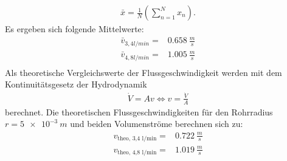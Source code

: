 \begin{align*}
  \bar{x}=\frac{1}{N} \left( \sum^{N}_{n=1} x_n \right).
\end{align*}
Es ergeben sich folgende Mittelwerte:
\begin{align*}
  \bar{v}_{3,4 l/min}= & \SI{0.658}{\frac{m}{s}} \\
  \bar{v}_{4,8 l/min}= & \SI{1.005}{\frac{m}{s}} \\
\end{align*}
Als theoretische Vergleichswerte der Flussgeschwindigkeit werden mit dem Kontinuitätsgesetz der Hydrodynamik
\begin{align}
  \dot{V}=A v \Leftrightarrow v= \frac{\dot{V}}{A}
  \label{eqn:konti}
\end{align}
berechnet.
Die theoretischen Flussgeschwindigkeiten für den Rohrradius $r=\SI{5e-3}{m}$ und beiden Volumenströme berechnen sich zu:
\begin{align*}
  v_{\text{theo, 3,4 l/min}}=& \SI{0.722}{\frac{m}{s}} \\
  v_{\text{theo, 4,8 l/min}}=& \SI{1.019}{\frac{m}{s}} \\
\end{align*}


\FloatBarrier
